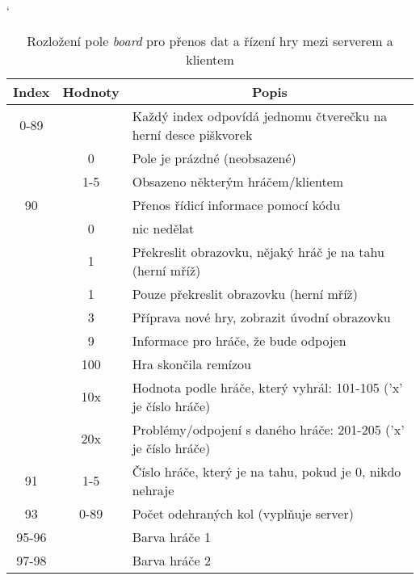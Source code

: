 \begin{table}[hbtp]
\catcode`
\caption{\label{tab:packet_server-client}Rozložení pole \textit{board} pro přenos dat a řízení hry mezi serverem a klientem}
\begin{tabular}{|c|c|l|}
\hline
Index   & Hodnoty     & \multicolumn{1}{c|}{Popis}                                      \\ \hline
0-89    &             & Každý index odpovídá jednomu čtverečku na herní desce piškvorek \\ \cline{2-3}
        & 0           & Pole je prázdné (neobsazené)                                    \\ \cline{2-3}
        & 1-5         & Obsazeno některým hráčem/klientem                               \\ \hline
90      &             & Přenos řídicí informace pomocí kódu                             \\ \cline{2-3}
        & 0           & nic nedělat                                                     \\ \cline{2-3}
        & 1           & Překreslit obrazovku, nějaký hráč je na tahu (herní mříž)       \\ \cline{2-3}
        & 1           & Pouze překreslit obrazovku  (herní mříž)                        \\ \cline{2-3}
        & 3           & Příprava nové hry, zobrazit úvodní obrazovku                    \\ \cline{2-3}
        & 9           & Informace pro hráče, že bude odpojen                            \\ \cline{2-3}
        & 100         & Hra skončila remízou                                            \\ \cline{2-3}
        & 10x         & Hodnota podle hráče, který vyhrál: 101-105 ('x' je číslo hráče) \\ \cline{2-3}
        & 20x         & Problémy/odpojení s daného hráče: 201-205 ('x' je číslo hráče)  \\ \hline
91      & 1-5         & Číslo hráče, který je na tahu, pokud je 0, nikdo nehraje        \\ \hline
93      & 0-89        & Počet odehraných kol (vyplňuje server)                          \\ \hline
95-96   &             & Barva hráče 1                                                   \\ \cline{1-1} \cline{3-3}
97-98   &             & Barva hráče 2                                                   \\ \cline{1-1} \cline{3-3}

\end{tabular}
\end{table}
